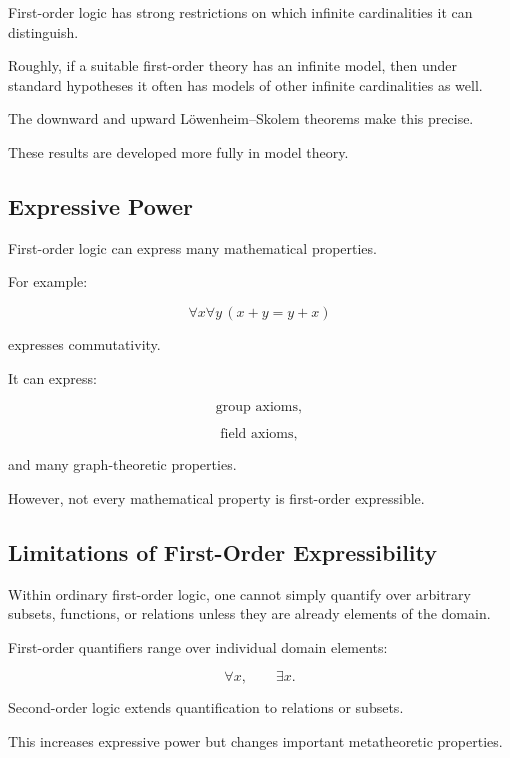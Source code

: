 First-order logic has strong restrictions on which infinite cardinalities
it can distinguish.

Roughly, if a suitable first-order theory has an infinite model, then under
standard hypotheses it often has models of other infinite cardinalities as
well.

The downward and upward Löwenheim--Skolem theorems make this precise.

These results are developed more fully in model theory.

\subsection{Expressive Power}
\label{subsec:first-order-expressive-power}

First-order logic can express many mathematical properties.

For example:

\[
\boxed{
\forall x\forall y
\,
(x+y=y+x)
}
\]

expresses commutativity.

It can express:

\[
\boxed{
\text{group axioms},
}
\]

\[
\boxed{
\text{field axioms},
}
\]

and many graph-theoretic properties.

However, not every mathematical property is first-order expressible.

\subsection{Limitations of First-Order Expressibility}
\label{subsec:first-order-limitations}

Within ordinary first-order logic, one cannot simply quantify over arbitrary
subsets, functions, or relations unless they are already elements of the
domain.

First-order quantifiers range over individual domain elements:

\[
\boxed{
\forall x,
\qquad
\exists x.
}
\]

Second-order logic extends quantification to relations or subsets.

This increases expressive power but changes important metatheoretic
properties.

